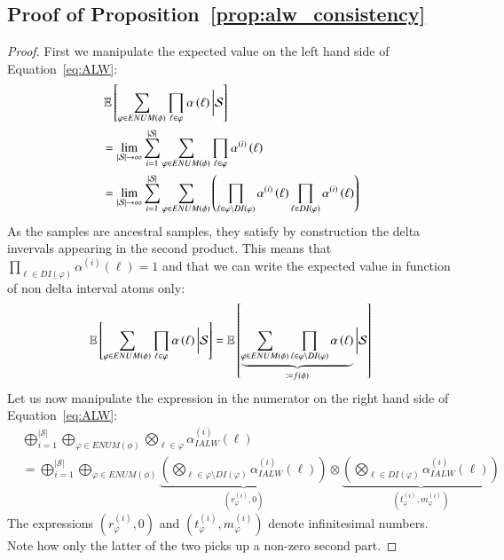 \subsection{Proof of Proposition~\ref{prop:alw_consistency}}
\label{app:proof:alw_consistency}


\alwconsistency*
\begin{proof}
    First we manipulate the expected value on the left hand side of Equation~\ref{eq:ALW}:
    \begin{align}
         & \operatorname*{\mathbb{E}} \left[ \sum_{\varphi \in ENUM(\phi)} \prod_{\ell \in \varphi}  \alpha \left(\ell \right) \bigg| \mathcal{S} \right]                                                           \\
         & =
        \lim_{ \lvert \mathcal{S} \rvert\rightarrow\infty} \sum_{i=1}^{ \lvert \mathcal{S} \rvert}  \sum_{\varphi \in ENUM(\phi)} \prod_{\ell \in \varphi}  \alpha^{(i)} \left(\ell \right) \\
         & =
        \lim_{ \lvert \mathcal{S} \rvert \rightarrow\infty} \sum_{i=1}^{ \lvert \mathcal{S} \rvert}  \sum_{\varphi \in ENUM(\phi)}
        \left(\prod_{\ell \in \varphi \setminus DI(\varphi)}  \alpha^{(i)} \left(\ell \right) \prod_{\ell \in DI(\varphi)}  \alpha^{(i)} \left(\ell \right)   \right)
    \end{align}
    As the samples are ancestral samples, they satisfy by construction the delta invervals appearing in the second product. This means that $\prod_{\ell \in DI(\varphi)}  \alpha^{(i)} \left(\ell \right) =1$ and that we can write the expected value in function of non delta interval atoms only:
    \begin{align}
        \operatorname*{\mathbb{E}} \left[ \sum_{\varphi\in ENUM(\phi)} \prod_{\ell \in \varphi}  \alpha \left(\ell \right) \bigg| \mathcal{S} \right]
        =
        \operatorname*{\mathbb{E}} \left[ \underbrace{\sum_{\varphi\in ENUM(\phi)} \prod_{\ell \in \varphi \setminus DI(\varphi)}  \alpha \left(\ell \right)}_{\coloneqq f(\phi)} \bigg| \mathcal{S} \right]  \label{eq:ALW_exp_simplified}
    \end{align}
    Let us now manipulate the expression in the numerator on the right hand side of Equation~\ref{eq:ALW}:
    \begin{align}
         & \bigoplus_{i=1}^{ \lvert \mathcal{S} \rvert}  \bigoplus_{\varphi \in ENUM(\phi)} \bigotimes_{\ell \in \varphi}  \alpha_{IALW}^{(i)} \left(\ell \right) \\
         & =
        \bigoplus_{i=1}^{ \lvert \mathcal{S} \rvert}  \bigoplus_{\varphi \in ENUM(\phi)}
        \underbrace{\left(  \bigotimes_{\ell \in \varphi \setminus DI(\varphi)}  \alpha_{IALW}^{(i)} \left(\ell \right) \right) }_{\left( r_\varphi^{(i)} , 0  \right)}  \otimes
        \underbrace{\left( \bigotimes_{\ell \in DI(\varphi)}  \alpha_{IALW}^{(i)} \left(\ell \right) \right) }_{\left( t_\varphi^{(i)} , m_\varphi^{(i)}  \right)} \label{eq:alw_proof_intermediate_1}
    \end{align}
    The expressions $\left( r_\varphi^{(i)} , 0  \right)$ and $\left( t_\varphi^{(i)} , m_\varphi^{(i)}  \right)$ denote infinitesimal numbers. Note how only the latter of the two picks up a non-zero second part.


\end{proof}
